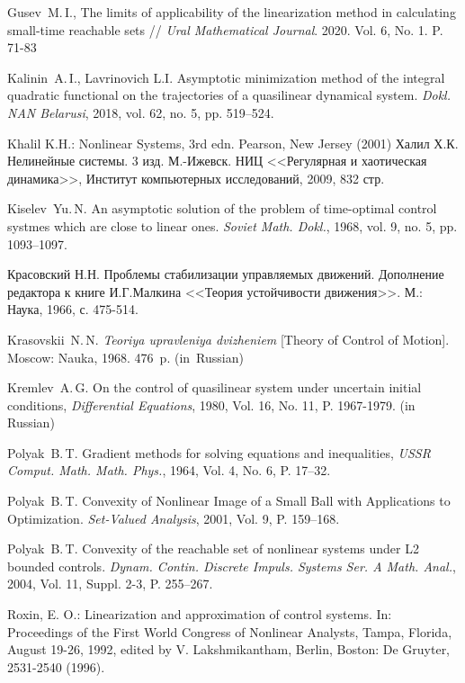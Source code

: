 \documentclass[../main.tex]{subfiles}
\begin{document}
\begin{thebibliography}{99}
Gusev~M.\,I., The limits of applicability of the linearization method in calculating small-time reachable sets // \emph{Ural Mathematical Journal}. 2020. Vol. 6, No. 1. P. 71-83


Kalinin~A.\,I., Lavrinovich L.I. Asymptotic minimization method of the integral quadratic functional on
the trajectories of a quasilinear dynamical system. \emph{Dokl. NAN Belarusi}, 2018, vol. 62, no. 5, pp. 519–524.

Khalil K.H.: Nonlinear Systems, 3rd edn. Pearson, New Jersey (2001)
Халил Х.К. Нелинейные системы. 3 изд. М.-Ижевск. НИЦ <<Регулярная и хаотическая динамика>>, Институт компьютерных исследований, 2009, 832 стр.

Kiselev~Yu.\,N. An asymptotic solution of the problem of time-optimal control systmes which are close to
linear ones. \emph{Soviet Math. Dokl.}, 1968, vol. 9, no. 5, pp. 1093–1097.

Красовский Н.Н. Проблемы стабилизации управляемых движений. Дополнение редактора к книге И.Г.Малкина <<Теория устойчивости  движения>>. М.: Наука, 1966, с. 475-514.

{Krasovskii~N.\,N.} \emph{Teoriya upravleniya dvizheniem} [Theory of Control of Motion]. Moscow: Nauka, 1968. 476~p. (in~Russian)

Kremlev~A.\,G. On the control of quasilinear system under uncertain initial conditions, \emph{Differential Equations}, 1980, Vol. 16, No. 11, P. 1967-1979. (in Russian)

Polyak~B.\,T. Gradient methods for solving equations and inequalities, \emph{USSR Comput. Math. Math. Phys.}, 1964, Vol. 4, No. 6, P. 17–32.

Polyak~B.\,T. Convexity of Nonlinear Image of a Small Ball with Applications to Optimization. \emph{Set-Valued Analysis}, 2001, Vol. 9, P. 159–168.

Polyak~B.\,T. Convexity of the reachable set of nonlinear systems under L2 bounded controls. \emph{Dynam. Contin. Discrete Impuls. Systems Ser. A Math. Anal.}, 2004, Vol. 11, Suppl. 2-3,  P. 255–267.

Roxin, E. O.: Linearization and approximation of control systems. In: Proceedings of the First World Congress of Nonlinear Analysts, Tampa, Florida, August 19-26, 1992, edited by V. Lakshmikantham, Berlin, Boston: De Gruyter, 2531-2540 (1996). 


\end{thebibliography}
\end{document}
